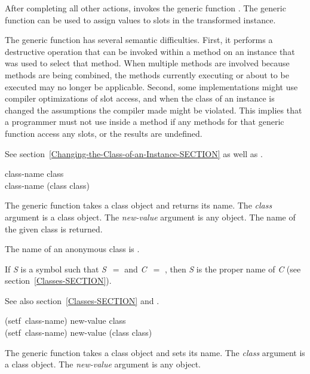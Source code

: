 \begin{defun}
After completing all other actions,  invokes the generic
function .  The generic function
can be used to assign values to slots in the transformed instance.

The generic function  has several semantic difficulties.
First, it performs a destructive operation that can be invoked within a
method on an instance that was used to select that method. When multiple
methods are involved because methods are being combined,
the methods currently executing or about to be executed
may no longer be applicable.  Second, some implementations might use compiler
optimizations of slot access, and when the class of an instance is
changed the assumptions the compiler made might be violated.
This implies that a programmer must not use 
 inside a method if any methods for that generic function 
access any slots, or the results are undefined.


See section~\ref{Changing-the-Class-of-an-Instance-SECTION} as well as
.
\end{defun}



\begin{defun}
class-name class \\
class-name (class class)

The generic function  takes a class object and returns its
name.
The {\it class\/} argument is a class object.
The {\it new-value\/} argument is any object.
The name of the given class is returned.

The name of an anonymous class is .

If {\it S} is a symbol such that {\it S}~$=$ and {\it C}~$=$
, then {\it S} is the proper name of {\it C} (see section~\ref{Classes-SECTION}).

See also section~\ref{Classes-SECTION} and .
\end{defun}


\begin{defun}
(setf~class-name) new-value class \\
(setf~class-name) new-value (class class)

The generic function  takes a class object and sets
its name.
The {\it class\/} argument is a class object.
The {\it new-value\/} argument is any object.
\end{defun}



